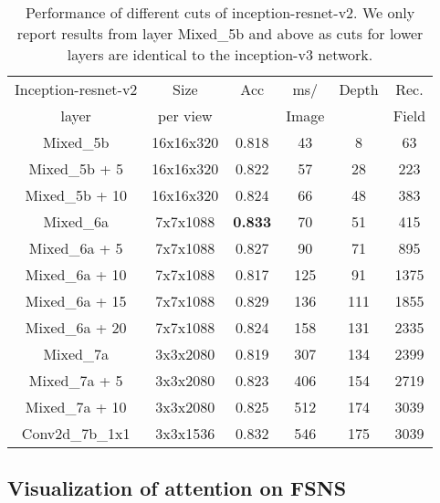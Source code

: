 \documentclass[conference]{IEEEtran}
\begin{document}
\begin{table}[t]
\caption{Performance of different cuts of inception-resnet-v2. We only report results from layer Mixed\_5b and above as cuts for lower layers are identical to the inception-v3 network.}
\label{tab:inception-resnet-v2-results}
\begin{center}
\begin{tabular}{| c | c | c | c | c | c |}
\hline Inception-resnet-v2 & Size            & Acc    & ms/     & Depth & Rec. \\
       layer                           & per view     &           & Image &           & Field \\ \hline \hline
Mixed\_5b                         & 16x16x320 & 0.818 & 43       & 8        & 63 \\ \hline
Mixed\_5b + 5                   & 16x16x320 & 0.822 & 57       & 28      & 223 \\ \hline
Mixed\_5b + 10                 & 16x16x320 & 0.824 & 66       & 48      & 383 \\ \hline
Mixed\_6a                         & 7x7x1088   & \textbf{0.833}   & 70 & 51 & 415\\ \hline
Mixed\_6a + 5                   & 7x7x1088   & 0.827 & 90       & 71      & 895 \\ \hline
Mixed\_6a + 10                 & 7x7x1088   & 0.817 & 125     & 91      & 1375 \\ \hline
Mixed\_6a + 15                 & 7x7x1088   & 0.829 & 136     & 111     & 1855 \\ \hline
Mixed\_6a + 20                 & 7x7x1088   & 0.824 & 158     & 131    & 2335 \\ \hline
Mixed\_7a                         & 3x3x2080   & 0.819 & 307     & 134    & 2399 \\ \hline
Mixed\_7a + 5                   & 3x3x2080   & 0.823 & 406     & 154    & 2719 \\ \hline
Mixed\_7a + 10                 & 3x3x2080   & 0.825 & 512     & 174    & 3039 \\ \hline
Conv2d\_7b\_1x1             & 3x3x1536   & 0.832 & 546      &   175  & 3039 \\ \hline
\end{tabular}
\end{center}
\end{table}

\subsection{Visualization of attention on FSNS}
\end{document}
